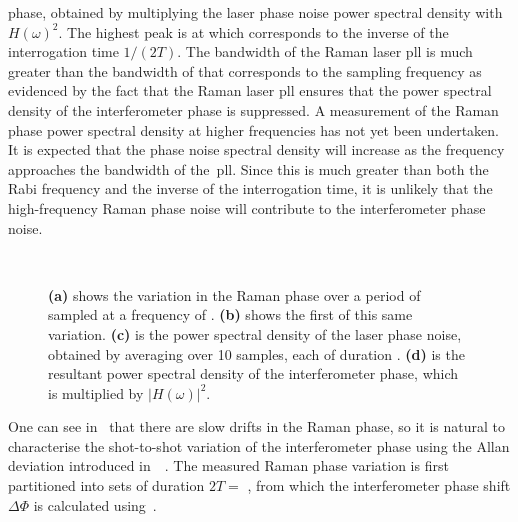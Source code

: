 phase, obtained by multiplying the laser phase noise power spectral
density with $H(\omega)^2$. The highest peak is at
 which corresponds to the inverse of the
interrogation time $1/(2T)$. The bandwidth of the Raman laser
\ac{pll} is much greater than the 
bandwidth of  that corresponds to the
 sampling frequency as evidenced by the fact that
the Raman laser \ac{pll} ensures that
the power spectral density of the interferometer phase is suppressed.
A measurement of the Raman phase power spectral density at higher frequencies has
not yet been undertaken. It is expected that the phase noise spectral
density will increase as the frequency approaches the bandwidth of
the~\ac{pll}. Since this is much greater than both the Rabi frequency
and the inverse of the interrogation time, it is unlikely that the
high-frequency Raman phase noise will contribute to the interferometer
phase noise.
\begin{figure}[htpb!]
  \centering
{}
\\
\caption[Interferometer phase noise due to the Raman
phase]{\textbf{(a)}
  shows the variation in the Raman phase over a period of
   sampled at a frequency of .
  \textbf{(b)} shows the first  of this same variation.
  \textbf{(c)} is the power spectral density of the laser phase noise,
  obtained by averaging over 10 samples, each of duration
  .
  \textbf{(d)} is the resultant power spectral density of the
interferometer phase, which is multiplied by $|H(\omega)|^2$.}
  \label{fig:laser_phase_noise}
\end{figure}
\par\noindent
One can see in~ that there are slow
drifts in the Raman phase, 
so it is natural to characterise the shot-to-shot variation of the
interferometer phase using the
Allan deviation introduced
in~~\nocite{Gouet2008}. The measured Raman phase
variation is first partitioned into sets of duration
$2T = $ , from which the interferometer phase shift $\Delta
\Phi$ is calculated using~.
